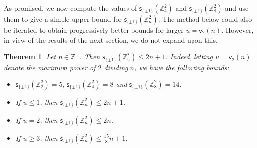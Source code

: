 \documentclass[11pt,reqno]{amsart}
\numberwithin{equation}{section}
\newtheorem{Theorem} {Theorem} [section]
\theoremstyle{definition}
\numberwithin{equation}{section}
\begin{document}
As promised, we now compute the values of $\mathsf s_{\{\pm 1\}}({\mathbb Z}_4^2)$ and $\mathsf s_{\{\pm 1\}}({\mathbb Z}_8^2)$
and use them to give a simple upper bound for $\mathsf s_{\{\pm 1\}}({\mathbb Z}_{n}^2)$. The method below could also be iterated
to obtain progressively better bounds for larger $u={\mathsf v}_2(n)$. However, in view of the results of the next section,
we do not expand upon this.
\begin{Theorem} \label{thm-constant-2-epsilon}Let $n\in {\mathbb Z}^+$. Then $\mathsf s_{\{\pm 1\}}({\mathbb Z}_{n}^2)\leq 2n+1$.
Indeed, letting $u={\mathsf v}_2(n)$ denote the maximum power of $2$ dividing $n$, we have the following bounds:
\begin{itemize}
\item[(i)] $\mathsf s_{\{\pm 1\}}({\mathbb Z}_2^2)=5$, $\mathsf s_{\{\pm 1\}}({\mathbb Z}_4^2)=8$ and $\mathsf s_{\{\pm 1\}}({\mathbb Z}_8^2)=14$.
\item[(ii)] If $u\leq 1$, then $\mathsf s_{\{\pm 1\}}({\mathbb Z}^2_{n})\leq 2n+1$.
\item[(iii)] If $u=2$, then $\mathsf s_{\{\pm 1\}}({\mathbb Z}^2_{n})\leq 2n$.
\item[(iv)] If $u\geq 3$, then $\mathsf s_{\{\pm 1\}}({\mathbb Z}_{n}^2)\leq  \frac{15}{8}n+1$.
\end{itemize}
\end{Theorem}
\end{document}
